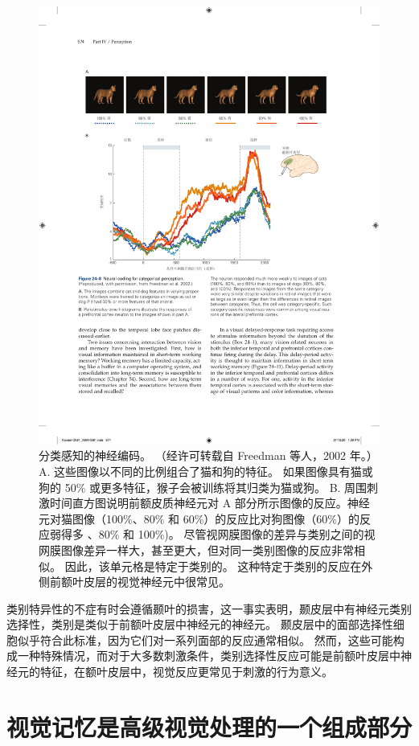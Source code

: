 \begin{figure}[htbp]
	\centering
	\includegraphics[width=0.9\linewidth]{chap24/fig_24_8}
	\caption{分类感知的神经编码。 （经许可转载自 Freedman 等人，2002 年。） A. 这些图像以不同的比例组合了猫和狗的特征。 如果图像具有猫或狗的 50\% 或更多特征，猴子会被训练将其归类为猫或狗。 B. 周围刺激时间直方图说明前额皮质神经元对 A 部分所示图像的反应。神经元对猫图像（100\%、80\% 和 60\%）的反应比对狗图像（60\%）的反应弱得多 、80\% 和 100\%)。 尽管视网膜图像的差异与类别之间的视网膜图像差异一样大，甚至更大，但对同一类别图像的反应非常相似。 因此，该单元格是特定于类别的。 这种特定于类别的反应在外侧前额叶皮层的视觉神经元中很常见。}
	\label{fig:24_8}
\end{figure}


类别特异性的不症有时会遵循颞叶的损害，这一事实表明，颞皮层中有神经元类别选择性，类别是类似于前额叶皮层中神经元的神经元。
颞皮层中的面部选择性细胞似乎符合此标准，因为它们对一系列面部的反应通常相似。
然而，这些可能构成一种特殊情况，而对于大多数刺激条件，类别选择性反应可能是前额叶皮层中神经元的特征，在额叶皮层中，视觉反应更常见于刺激的行为意义。



\section{视觉记忆是高级视觉处理的一个组成部分}

